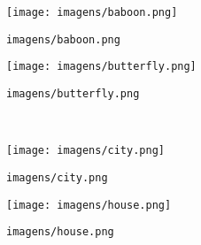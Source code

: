 \begin{subfigure}{0.33\textwidth}
    \centering
    \texttt{[image: imagens/baboon.png]}
    \caption{\texttt{imagens/baboon.png}}
\end{subfigure}%
\begin{subfigure}{0.33\textwidth}
    \centering
    \texttt{[image: imagens/butterfly.png]}
    \caption{\texttt{imagens/butterfly.png}}
\end{subfigure}\\[8pt]
\begin{subfigure}{0.33\textwidth}
    \centering
    \texttt{[image: imagens/city.png]}
    \caption{\texttt{imagens/city.png}}
\end{subfigure}%
\begin{subfigure}{0.33\textwidth}
    \centering
    \texttt{[image: imagens/house.png]}
    \caption{\texttt{imagens/house.png}}
\end{subfigure}
